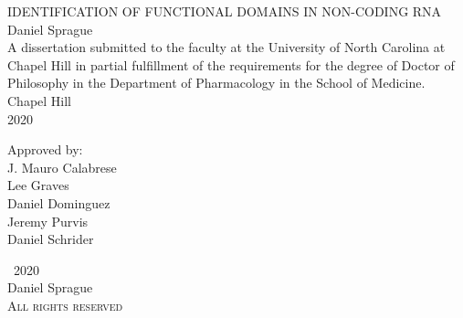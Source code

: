 \documentclass[11pt]{report}
\def\frontmatter{%
    \pagenumbering{roman}
    \setcounter{page}{1}
    \renewcommand{\thesection}{\Roman{section}}
}%
\begin{document}
\begin{titlepage}
   \begin{singlespacing}
   \begin{center}
       \vspace*{1in}
       \textsc{IDENTIFICATION OF FUNCTIONAL DOMAINS IN NON-CODING RNA}\\
       \vspace{1in}
       Daniel Sprague\\
       \vspace{1in}
       A dissertation submitted to the faculty at the University of North Carolina at Chapel Hill in partial fulfillment of the requirements for the degree of Doctor of Philosophy in the Department of Pharmacology in the School of Medicine.\\
       \vspace{1in}
       Chapel Hill\\
       2020
    \end{center}
    \end{singlespacing}
    \vspace{1in}
    \begin{flushleft}
    \hspace{3.9in} Approved by:\\
     \hspace{3.9in}  J. Mauro Calabrese\\
     \hspace{3.9in}   Lee Graves\\
      \hspace{3.9in}  Daniel Dominguez\\
      \hspace{3.9in}  Jeremy Purvis\\
      \hspace{3.9in}   Daniel Schrider
      \end{flushleft}
\end{titlepage}
\frontmatter

\clearpage 
\thispagestyle{plain}
\begin{center}
    \null 
    \vfill
    \begin{singlespacing}
    \textcopyright \ 2020\\
    Daniel Sprague\\
    \textsc{All rights reserved}
    \end{singlespacing}
\end{center}

\renewcommand\abstractname{\normalfont\textsc{Abstract}}
\end{document}
